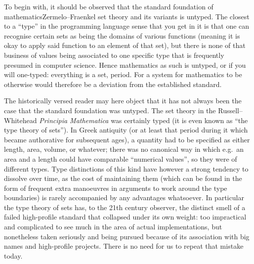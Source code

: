 \documentclass{mtmtcl}
\theoremstyle{plain}
\theoremstyle{remark}
\begin{document}
To begin with, it should be observed that the standard foundation of 
mathematics\Ldash Zermelo--Fraenkel set theory and its variants\Rdash 
is untyped. The closest to a ``type'' in the programming language sense 
that you get in it is that one can recognise certain sets as being 
the domains of various functions (meaning it is okay to apply said 
function to an element of that set), but there is none of that business of 
values being associated to one specific type that is frequently presumed 
in computer science. Hence mathematics as such is untyped, or if you 
will one-typed: everything is a set, period. For a system for mathematics 
to be otherwise would therefore be a deviation from the established 
standard.

The historically versed reader may here object that it has not always been 
the case that the standard foundation was untyped. The 
set theory in the Russell--Whitehead \emph{Principia Mathematica} was 
certainly typed (it is even known as ``the type theory of sets''). 
In Greek antiquity (or at least that period during it which became 
authorative for subsequent ages), a quantity had to be specified as 
either length, area, volume, or whatever; there was no canonical way in 
which e.g.~an area and a length could have comparable ``numerical 
values'', so they were of different types.
Type distinctions of this kind have however a strong tendency to dissolve 
over time, as the cost of maintaining them (which can be found in the 
form of frequent extra manoeuvres in arguments to work around the 
type boundaries) is rarely accompanied by any advantages whatsoever. 
In particular the type theory of sets has, to the 21th century observer, 
the distinct smell of a failed high-profile standard that collapsed under 
its own weight: too impractical and complicated to see much in the area 
of actual implementations, but nonetheless taken seriously and being 
pursued because of its association with big names and high-profile 
projects. There is no need for us to repeat that mistake today.

\end{document}
